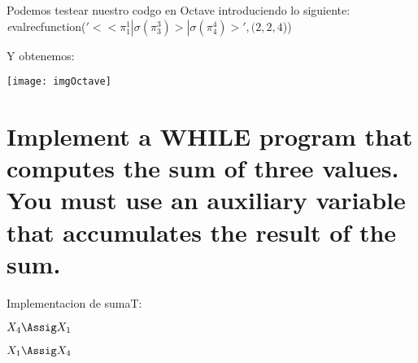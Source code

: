 \documentclass{article}
\begin{document}
	      
Podemos testear nuestro codgo en Octave introduciendo lo siguiente:
\emph evalrecfunction($'<<\pi^1_1|\sigma(\pi^3_3)>|\sigma(\pi^4_4)>', (2,2,4$))

Y obtenemos:


\centering
	\texttt{[image: imgOctave]}
	\flushleft





\section{ Implement  a  WHILE  program  that  computes  the  sum  of  three  values.   You
must use an auxiliary variable that accumulates the result of the sum.}

Implementacion de sumaT:


  \begin{whilecode}[H]

  $X_4 \Assig X_1$\;
  
 
 
  $X_1 \Assig X_4$\;
  
\end{whilecode}
\end{document}
